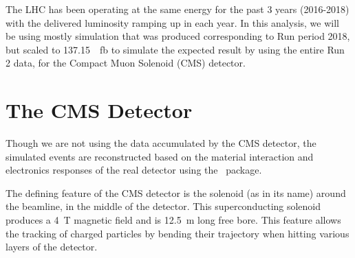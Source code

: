 The LHC has been operating at the same energy for the past 3 years (2016-2018) with 
the delivered luminosity ramping up in each year\cite{luminosity}. In this analysis, we will be using
mostly simulation that was produced corresponding to Run period 2018, but scaled to 
\SI{137.15}{\per\femto\barn} to simulate the expected result by using the entire Run 2 data,
for the Compact Muon Solenoid (CMS) detector.


\section{The CMS Detector}




Though we are not using the data accumulated by the CMS detector, the simulated events are
reconstructed based on the material interaction and electronics responses of the real detector using the
\gf~package\cite{geant4}.

The defining feature of the CMS detector is the solenoid (as in its name) around the beamline, in the
middle of the detector\cite{solenoid_map}.
This superconducting solenoid produces a \SI{4}{\tesla} magnetic field and is 
\SI{12.5}{\meter} long free bore\cite{solenoid_map}. This feature allows the tracking of
charged particles by bending their trajectory when hitting various layers of the detector.


